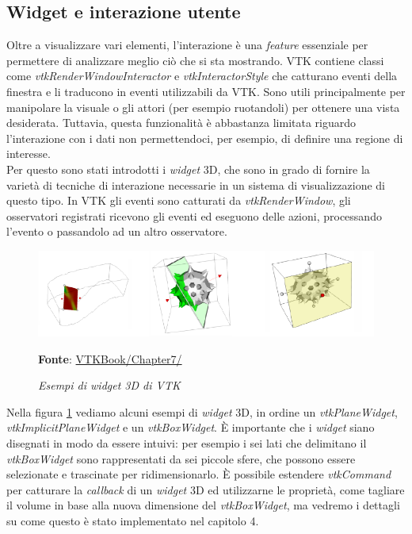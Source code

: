 \subsection{Widget e interazione utente}\label{sec:widget-interazione}
Oltre a visualizzare vari elementi, l'interazione è una \emph{feature} essenziale per permettere di analizzare meglio ciò che si sta mostrando. VTK contiene classi come \emph{vtkRenderWindowInteractor} e \emph{vtkInteractorStyle} che catturano eventi della finestra e li traducono in eventi utilizzabili da VTK. Sono utili principalmente per manipolare la visuale o gli attori (per esempio ruotandoli) per ottenere una vista desiderata. Tuttavia, questa funzionalità è abbastanza limitata riguardo l'interazione con i dati non permettendoci, per esempio, di definire una regione di interesse.\\
Per questo sono stati introdotti i \emph{widget} 3D, che sono in grado di fornire la varietà di tecniche di interazione necessarie in un sistema di visualizzazione di questo tipo. In VTK gli eventi sono catturati da \emph{vtkRenderWindow}, gli osservatori registrati ricevono gli eventi ed eseguono delle azioni, processando l'evento o passandolo ad un altro osservatore.

\begin{figure}[h]
    \centering
    \includegraphics[scale=0.5]{immagini/volumerendering/widgets.png}
    \caption{\textit{Esempi di widget 3D di VTK}}
    \textbf{Fonte}: \href{https://lorensen.github.io/VTKExamples/site/VTKBook/07Chapter7/}{VTKBook/Chapter7/}
    \label{fig: VTK 3D Widgets}
\end{figure}

Nella figura \ref{fig: VTK 3D Widgets} vediamo alcuni esempi di \emph{widget} 3D, in ordine un \emph{vtkPlaneWidget}, \emph{vtkImplicitPlaneWidget} e un \emph{vtkBoxWidget}. \`E importante che i \emph{widget} siano disegnati in modo da essere intuivi: per esempio i sei lati che delimitano il \emph{vtkBoxWidget} sono rappresentati da sei piccole sfere, che possono essere selezionate e trascinate per ridimensionarlo. \`E possibile estendere \emph{vtkCommand} per catturare la \emph{callback} di un \emph{widget} 3D ed utilizzarne le proprietà, come tagliare il volume in base alla nuova dimensione del \emph{vtkBoxWidget}, ma vedremo i dettagli su come questo è stato implementato nel capitolo 4.

